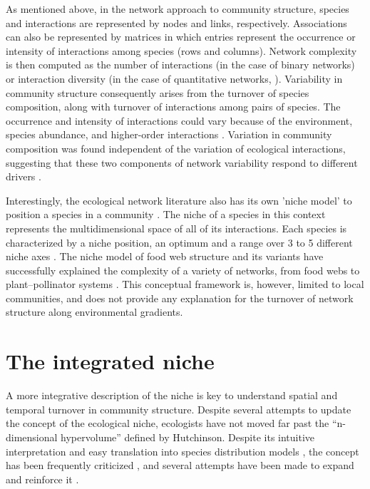 \documentclass[12pt]{article}
\begin{document}
As mentioned above, in the network approach to community structure, species
and interactions are represented by nodes and links, respectively.
Associations can also be represented by matrices in which entries represent
the occurrence or intensity of interactions among species (rows and columns).
Network complexity is then computed as the number of interactions (in the case
of binary networks) or interaction diversity (in the case of quantitative
networks, \citealt{Bersier2002}). Variability in community structure
consequently arises from the turnover of species composition, along with
turnover of interactions among pairs of species. The occurrence and intensity
of interactions could vary because of the environment, species abundance, and
higher-order interactions \citep{Poisot2015a}. Variation in community
composition was found independent of the variation of ecological interactions,
suggesting that these two components of network variability respond to
different drivers \citep{Poisot2012}.

Interestingly, the ecological network literature also has its own ’niche
model’ to position a species in a community \citep{Williams2000}. The niche of a
species in this context represents the multidimensional space of all of its
interactions. Each species is characterized by a niche position, an optimum
and a range over 3 to 5 different niche axes \citep{Williams2000, Eklof2013}.
The niche model of food web structure and its variants have successfully explained the
complexity of a variety of networks, from food webs to plant–pollinator
systems \citep{Allesina2008, Williams2010, Eklof2013}. This
conceptual framework is, however, limited to local communities, and does not
provide any explanation for the turnover of network structure along
environmental gradients.

\section*{The integrated niche}

A more integrative description of the niche is key to understand spatial and
temporal turnover in community structure. Despite several attempts to update
the concept of the ecological niche, ecologists have not moved far past the
``n-dimensional hypervolume'' defined by Hutchinson. Despite its intuitive
interpretation and easy translation into species distribution models
\citep{Boulangeat2012, Blonder2014}, the concept has been frequently
criticized \citep{Hardin1960, Peters1991, Silvertown2004}, and several
attempts have been made to expand and reinforce it \citep{Pulliam2000,
Chase2003, Soberon2007, Holt2009, McInerny2012b}.
\end{document}
